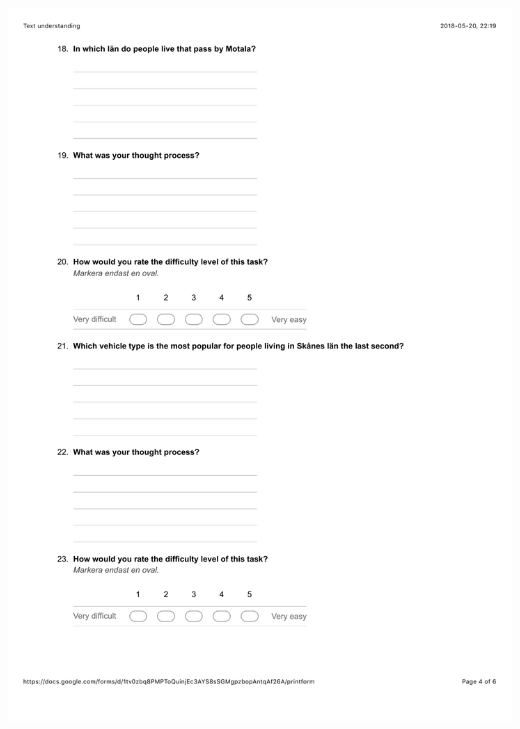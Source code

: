 \documentclass[12pt]{kththesis}
\begin{document}
\begin{appendices}
\includegraphics[width=1\textwidth]{TextUnderstanding4.pdf}
\newpage

\end{appendices}
\end{document}
